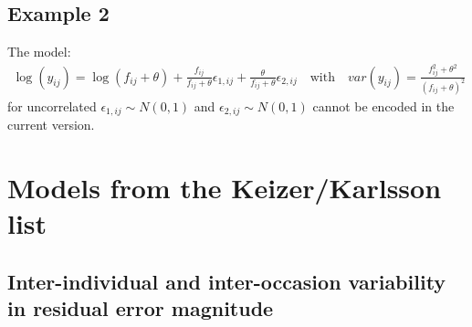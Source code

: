 \documentclass[a4paper,10pt]{article}
\begin{document}
\subsection{Example 2} 
The model:
\begin{eqnarray}
\log(y_{ij}) =  \log(f_{ij}+\theta) + \frac{f_{ij}}{f_{ij}+\theta} \epsilon_{1,ij} + \frac{\theta}{f_{ij}+\theta} \epsilon_{2,ij} 
\quad \text{with} \quad \mathit{var}(y_{ij}) = \frac{f_{ij}^2 + \theta^2}{(f_{ij}+\theta)^2}\nonumber
\end{eqnarray}
for uncorrelated $\epsilon_{1,ij}\sim N(0,1)$ and $\epsilon_{2,ij}\sim N(0,1)$ cannot be encoded in the current version.


\newpage
\section{Models from the Keizer/Karlsson list}

\subsection{Inter-individual and inter-occasion variability in residual error magnitude}
\label{modelKK_RM1}


\end{document}
